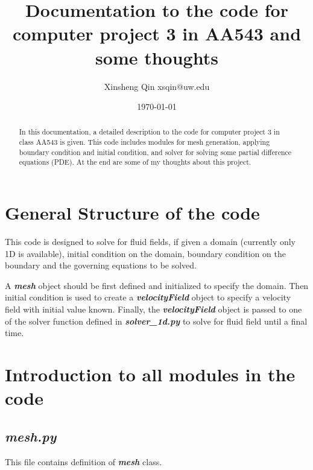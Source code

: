 \documentclass[11pt]{article}
\begin{document}
\title{Documentation to the code for computer project 3 in AA543 and some thoughts}

\author{Xinsheng Qin xsqin@uw.edu}
\date{\today} %


\maketitle

\begin{abstract}
In this documentation, a detailed description to the code for computer project 3 in class AA543 is given.
This code includes modules for mesh generation, applying boundary condition and initial condition, and solver for solving some partial difference equations (PDE). 
At the end are some of my thoughts about this project.
\end{abstract}
\newpage

\tableofcontents
\newpage

\section{General Structure of the code}
This code is designed to solve for fluid fields, if given a domain (currently only 1D is available), initial condition on the domain, boundary condition on the boundary and the governing equations to be solved.
\par

A \textbf{\textit{mesh}} object should be first defined and initialized to specify the domain. 
Then initial condition is used to create a \textbf{\textit{velocityField}} object to specify a velocity field with initial value known. 
Finally, the \textbf{\textit{velocityField}} object is passed to one of the solver function defined in \textbf{\textit{solver\_1d.py}} to solve for fluid field until a final time. 

\section{Introduction to all modules in the code}
    \subsection{\textbf{\textit{mesh.py}}}
    This file contains definition of \textbf{\textit{mesh}} class.
\end{document}

